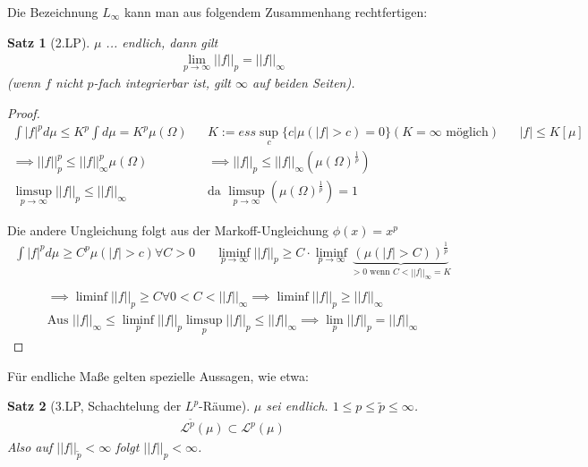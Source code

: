 \documentclass[]{article}
\newtheorem{theorem}{Satz}
\begin{document}
Die Bezeichnung $L_\infty$ kann man aus folgendem Zusammenhang rechtfertigen:

\begin{theorem}[2.LP]
	$\mu$ ... endlich, dann gilt
	\begin{align*}
		\lim\limits_{p\rightarrow\infty} ||f||_p = ||f||_\infty
	\end{align*}
	(wenn $f$ nicht $p$-fach integrierbar ist, gilt $\infty$ auf beiden Seiten).
\end{theorem}

\begin{proof}
	\begin{align*}
		\int |f|^p d\mu \leq K^p \int d\mu = K^p \mu(\Omega) && K := ess\sup_c \{c| \mu(|f|>c)=0\} (K=\infty\text{ möglich}) && |f| \leq K [\mu]\\
		\implies ||f||^p_p \leq ||f||_\infty^p \mu(\Omega) && \implies ||f||_p \leq ||f||_\infty (\mu(\Omega)^{\frac{1}{p}})\\
		\limsup_{p\rightarrow\infty} ||f||_p \leq ||f||_\infty && \text{da } \limsup_{p\rightarrow\infty}(\mu(\Omega)^{\frac{1}{p}}) = 1
	\end{align*}

	Die andere Ungleichung folgt aus der Markoff-Ungleichung $\phi(x)=x^p$
	\begin{align*}
		\int |f|^p d\mu \geq C^p \mu(|f|>c) \forall C>0 &&
		\liminf_{p\rightarrow\infty} ||f||_p \geq C \cdot \liminf_{p\rightarrow\infty} \underbrace{(\mu(|f|>C))^{\frac{1}{p}}}_{>0 \text{ wenn } C < ||f||_\infty = K}\\
	\end{align*}
	\begin{align*}
		\implies \liminf ||f||_p \geq C \forall 0 < C < ||f||_\infty \implies \liminf ||f||_p \geq ||f||_\infty\\
		\text{Aus } ||f||_\infty \leq \liminf_p ||f||_p \limsup_p ||f||_p \leq ||f||_\infty \implies \lim_p ||f||_p = ||f||_\infty
	\end{align*}
\end{proof}

Für endliche Maße gelten spezielle Aussagen, wie etwa:

\begin{theorem}[3.LP, Schachtelung der $L^p$-Räume]
	$\mu$ sei endlich. $1\leq p \leq \tilde{p} \leq \infty$.
	\begin{align*}
		\mathcal{L}^{\tilde{p}}(\mu) \subset \mathcal{L}^p(\mu)
	\end{align*}
	Also auf $||f||_{\tilde{p}} < \infty$ folgt $||f||_p < \infty$.
\end{theorem}
\end{document}
